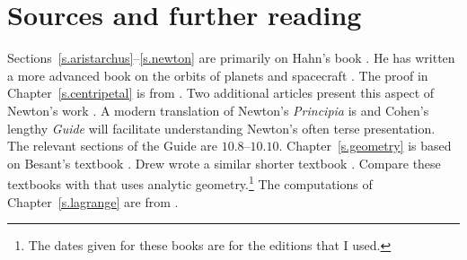 
\chapter*{Sources and further reading}


Sections~\ref{s.aristarchus}--\ref{s.newton} are primarily on Hahn's book \cite{hahn-cic}. He has written a more advanced book on the orbits of planets and spacecraft \cite{hahn-orbits}. The proof in Chapter~\ref{s.centripetal} is from \cite{griffiths}. Two additional articles present this aspect of Newton's work \cite{hauser-lang,stein}. A modern translation of Newton's \emph{Principia} is \cite{newton-cohen} and Cohen's lengthy \textit{Guide} will facilitate understanding Newton's often terse presentation. The relevant sections of the Guide are $10.8$--$10.10$. Chapter~\ref{s.geometry} is based on Besant's textbook \cite{besant}. Drew wrote a similar shorter textbook \cite{drew}. Compare these textbooks with \cite{smith} that uses analytic geometry.\footnote{The dates given for these books are for the editions that I used.} The computations of Chapter~\ref{s.lagrange} are from \cite{stern}.

\begin{small}


\end{small}
